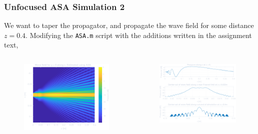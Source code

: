 \documentclass[compress]{beamer}
\begin{document}
\begin{frame}[fragile] %
    \frametitle{Unfocused ASA Simulation 2}
    We want to taper the propagator, and propagate the wave field for some distance $z=0.4$.
    Modifying the \texttt{ASA.m} script with the additions written in the assignment text,
    \begin{columns}
        \begin{column}{0.5\textwidth}
            \begin{figure}
                \includegraphics[width=\columnwidth]{"../2a.pdf"}
            \end{figure}
        \end{column}
        \begin{column}{0.5\textwidth}
            \begin{figure}
                \includegraphics[width=\columnwidth]{"../2b.pdf"}

\end{figure}
\end{column}
\end{columns}
\end{frame}
\end{document}
